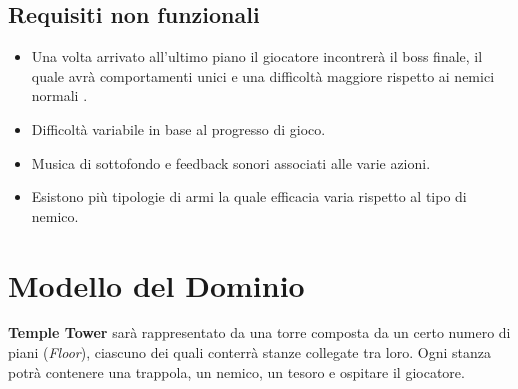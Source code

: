 \documentclass[a4paper,12pt]{report}
\begin{document}
\subsection*{Requisiti non funzionali}
\begin{itemize}
	\item Una volta arrivato all'ultimo piano il giocatore incontrerà il boss finale, il quale avrà comportamenti  unici e una difficoltà maggiore rispetto ai nemici normali .
	\item Difficoltà variabile in base al progresso di gioco.
	\item Musica di sottofondo e feedback sonori associati alle varie azioni.
	\item Esistono più tipologie di armi la quale efficacia varia rispetto al tipo di nemico.
\end{itemize}

\section{Modello del Dominio}
\textbf{Temple Tower} sarà rappresentato da una torre composta da un certo numero di piani (\textit{Floor}), 
%
ciascuno dei quali conterrà stanze collegate tra loro. Ogni stanza potrà contenere una trappola, un nemico, un tesoro e ospitare il giocatore.
\end{document}

